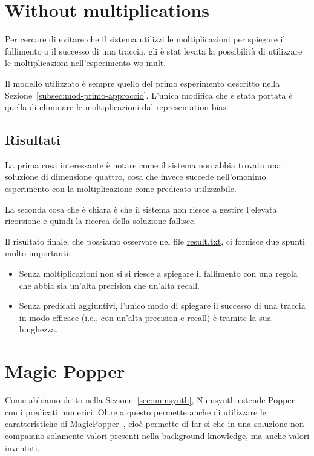 \section{Without multiplications}
\label{sec:wo-mult}
Per cercare di evitare che il sistema utilizzi le moltiplicazioni per spiegare il fallimento o il successo di una traccia, gli è stat levata la possibilità di utilizzare le moltiplicazioni nell'esperimento \href{https://github.com/edoardosarri24/numsynth/tree/main/my-experiments/4-wo-mult/}{wo-mult}.

Il modello utilizzato è sempre quello del primo esperimento descritto nella Sezione~\ref{subsec:mod-primo-approccio}. L'unica modifica che è stata portata è quella di eliminare le moltiplicazioni dal representation bias.

\subsection{Risultati}
La prima cosa interessante è notare come il sistema non abbia trovato una soluzione di dimensione quattro, cosa che invece succede nell'omonimo esperimento con la moltiplicazione come predicato utilizzabile.

La seconda cosa che è chiara è che il sistema non riesce a gestire l'elevata ricorsione e quindi la ricerca della soluzione fallisce.

\myskip

Il risultato finale, che possiamo osservare nel file \href{https://github.com/edoardosarri24/numsynth/tree/main/my-experiments/4-wo-mult/result.txt}{result.txt}, ci fornisce due spunti molto importanti:
\begin{itemize}
    \item Senza moltiplicazioni non si si riesce a spiegare il fallimento con una regola che abbia sia un'alta precision che un'alta recall.
    \item Senza predicati aggiuntivi, l'unico modo di spiegare il successo di una traccia in modo efficace (i.e., con un'alta precision e recall) è tramite la sua lunghezza.
\end{itemize}

\section{Magic Popper}
\label{sec:magic-popper}
Come abbiamo detto nella Sezione~\ref{sec:numsynth}, Numsynth estende Popper con i predicati numerici. Oltre a questo permette anche di utilizzare le caratteristiche di MagicPopper~\cite{hocquette2023learning}, cioè permette di far si che in una soluzione non compaiano solamente valori presenti nella background knowledge, ma anche valori inventati.

